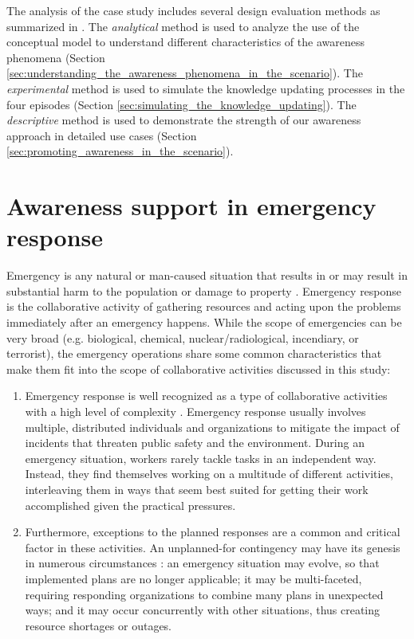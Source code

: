 The analysis of the case study includes several design evaluation methods as summarized in \cite{Hevner2004}. The \emph{analytical} method is used to analyze the use of the conceptual model to understand different characteristics of the awareness phenomena (Section \ref{sec:understanding_the_awareness_phenomena_in_the_scenario}). The \emph{experimental} method is used to simulate the knowledge updating processes in the four episodes (Section \ref{sec:simulating_the_knowledge_updating}). The \emph{descriptive} method is used to demonstrate the strength of our awareness approach in detailed use cases (Section \ref{sec:promoting_awareness_in_the_scenario}). 

\section{Awareness support in emergency response} %
\label{sec:awareness_support_in_emergency_response}
Emergency is any natural or man-caused situation that results in or may result in substantial harm to the population or damage to property \cite{shen2004managing}. Emergency response is the collaborative activity of gathering resources and acting upon the problems immediately after an emergency happens. While the scope of emergencies can be very broad (e.g. biological, chemical, nuclear/radiological, incendiary, or terrorist), the emergency operations share some common characteristics that make them fit into the scope of collaborative activities discussed in this study:

\begin{enumerate}
	\item Emergency response is well recognized as a type of collaborative activities with a high level of complexity \cite{Turoff2004}. Emergency response usually involves multiple, distributed individuals and organizations to mitigate the impact of incidents that threaten public safety and the environment. During an emergency situation, workers rarely tackle tasks in an independent way. Instead, they find themselves working on a multitude of different activities, interleaving them in ways that seem best suited for getting their work accomplished given the practical pressures.
	\item Furthermore, exceptions to the planned responses are a common and critical factor in these activities. An unplanned-for contingency may have its genesis in numerous circumstances \cite{Mendonca2004}: an emergency situation may evolve, so that implemented plans are no longer applicable; it may be multi-faceted, requiring responding organizations to combine many plans in unexpected ways; and it may occur concurrently with other situations, thus creating resource shortages or outages.
\end{enumerate}


